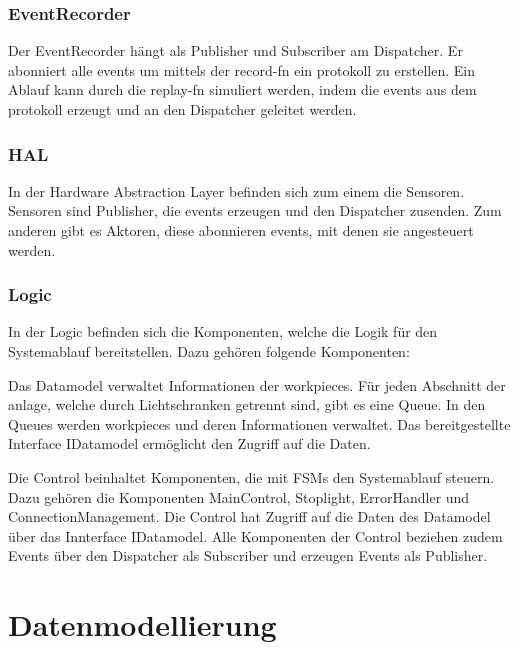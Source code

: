 \subsubsection{EventRecorder}
Der EventRecorder hängt als Publisher und Subscriber am Dispatcher.
Er abonniert alle \glspl{event} um mittels der \gls{record-fn} ein \gls{protokoll} zu erstellen.
Ein Ablauf kann durch die \gls{replay-fn} simuliert werden,
indem die \glspl{event} aus dem \gls{protokoll} erzeugt und an den Dispatcher geleitet werden.

\subsubsection{HAL}
In der Hardware Abstraction Layer befinden sich zum einem die Sensoren.
Sensoren sind Publisher, die \glspl{event} erzeugen und den Dispatcher zusenden.
Zum anderen gibt es Aktoren, diese abonnieren \glspl{event}, mit denen sie angesteuert werden.

\subsubsection{Logic}
In der Logic befinden sich die Komponenten, welche die Logik für den Systemablauf bereitstellen.
Dazu gehören folgende Komponenten:

Das Datamodel verwaltet Informationen der \glspl{workpiece}.
Für jeden Abschnitt der \gls{anlage}, welche durch Lichtschranken getrennt sind, gibt es eine Queue.
In den Queues werden \glspl{workpiece} und deren Informationen verwaltet.
Das bereitgestellte Interface IDatamodel ermöglicht den Zugriff auf die Daten.

Die Control beinhaltet Komponenten, die mit FSMs den Systemablauf steuern.
Dazu gehören die Komponenten MainControl, Stoplight, ErrorHandler und ConnectionManagement.
Die Control hat Zugriff auf die Daten des Datamodel über das Innterface IDatamodel.
Alle Komponenten der Control beziehen zudem Events über den Dispatcher als Subscriber und erzeugen Events als Publisher.



\section{Datenmodellierung}\label{sec:datenmodellierung}



